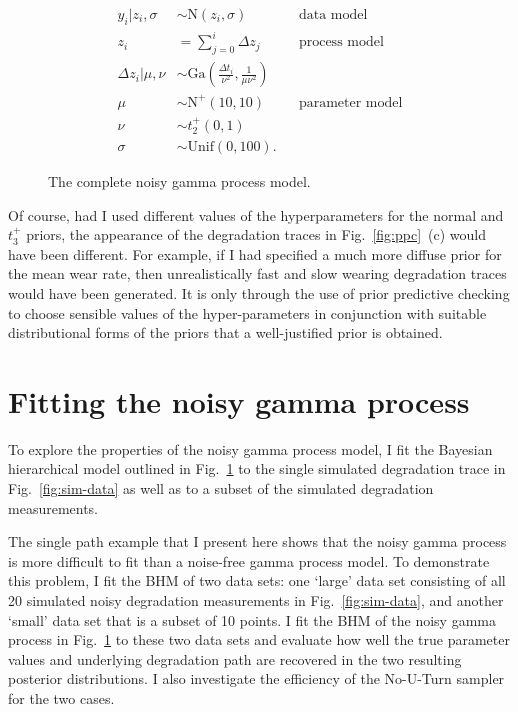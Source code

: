 \begin{figure}[tbp]
  \centering
  \begin{align*}
    y_i|z_i, \sigma & \sim \mbox{N}(z_i, \sigma)  && \mbox{data model} \\
    z_i & = \sum_{j=0}^i \Delta z_j && \mbox{process model} \\ 
    \Delta z_i|\mu, \nu & \sim \mbox{Ga} \left( \frac{\Delta t_i}{\nu^2}, \frac{1}{\mu \nu^2} \right) \\
    \mu & \sim \mbox{N}^{+}(10, 10) && \mbox{parameter model} \\
    \nu & \sim t_2^{+}(0, 1) \\
    \sigma & \sim \mbox{Unif}(0, 100).
  \end{align*}
  \caption{The complete noisy gamma process model.}
  \label{fig:ngp-full-model}
\end{figure}

Of course, had I used different values of the hyperparameters for the normal and $t_3^{+}$ priors, the appearance of the degradation traces in Fig.~\ref{fig:ppc}~(c) would have been different. For example, if I had specified a much more diffuse prior for the mean wear rate, then unrealistically fast and slow wearing degradation traces would have been generated. It is only through the use of prior predictive checking to choose sensible values of the hyper-parameters in conjunction with suitable distributional forms of the priors that a well-justified prior is obtained.

\section{Fitting the noisy gamma process} \label{sec:NGP-fitting}

To explore the properties of the noisy gamma process model, I fit the Bayesian hierarchical model outlined in Fig.~\ref{fig:ngp-full-model} to the single simulated degradation trace in Fig.~\ref{fig:sim-data} as well as to a subset of the simulated degradation measurements.

The single path example that I present here shows that the noisy gamma process is more difficult to fit than a noise-free gamma process model. To demonstrate this problem, I fit the BHM of two data sets: one `large' data set consisting of all 20 simulated noisy degradation measurements in Fig.~\ref{fig:sim-data}, and another `small' data set that is a subset of 10 points. I fit the BHM of the noisy gamma process in Fig.~\ref{fig:ngp-full-model} to these two data sets and evaluate how well the true parameter values and underlying degradation path are recovered in the two resulting posterior distributions. I also investigate the efficiency of the No-U-Turn sampler for the two cases.

